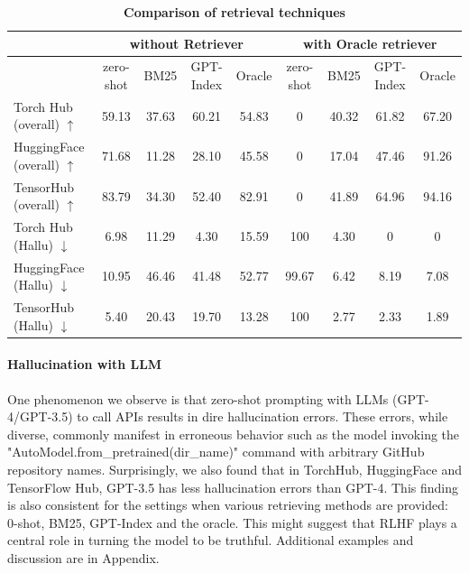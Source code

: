 \begin{table}[h]
    \caption{\small \textbf{Comparison of retrieval techniques}
    }
    \label{tab:retrieve}
     \setlength{\tabcolsep}{10pt} %
    \begin{adjustbox}{width=\textwidth}
    \begin{tabular}{l cccc | cccc}
    \toprule
    & \multicolumn{4}{c}{\gorilla{} without Retriever} & \multicolumn{4}{c}{\oursmethod{} with Oracle retriever} \\ 
     \midrule
    & zero-shot & BM25 & GPT-Index & Oracle & zero-shot & BM25 & GPT-Index & Oracle  \\
    \midrule
    Torch Hub (overall) $\uparrow$ & 59.13 & 37.63 & 60.21 & 54.83 & 0 & 40.32 & 61.82 & 67.20  \\
    HuggingFace (overall) $\uparrow$ & 71.68 & 11.28 & 28.10 & 45.58 & 0 & 17.04 & 47.46 & 91.26  \\
    TensorHub (overall)  $\uparrow$ & 83.79 & 34.30 & 52.40 & 82.91 & 0 & 41.89 & 64.96 & 94.16 \\
    \midrule
    Torch Hub (Hallu) $\downarrow$ & 6.98 & 11.29 & 4.30 & 15.59 & 100 & 4.30 & 0 & 0  \\
    HuggingFace (Hallu) $\downarrow$ & 10.95 & 46.46 & 41.48 & 52.77 & 99.67 & 6.42 & 8.19 & 7.08  \\
    TensorHub (Hallu) $\downarrow$ & 5.40 & 20.43 & 19.70 & 13.28 & 100 & 2.77 & 2.33 & 1.89\\
    \bottomrule
    \end{tabular}
    \end{adjustbox}
\end{table}

\paragraph{Hallucination with LLM} One phenomenon we observe is that zero-shot prompting with LLMs (GPT-4/GPT-3.5) to call APIs results in dire hallucination errors. These errors, while diverse, commonly manifest in erroneous behavior such as the model invoking the "AutoModel.from\_pretrained(dir\_name)" command with arbitrary GitHub repository names. Surprisingly, we also found that in TorchHub, HuggingFace and TensorFlow Hub, GPT-3.5 has less hallucination errors than GPT-4. This finding is also consistent for the settings when various retrieving methods are provided: 0-shot, BM25, GPT-Index and the oracle. This might suggest that RLHF plays a central role in turning the model to be truthful. Additional examples and discussion are in Appendix.

